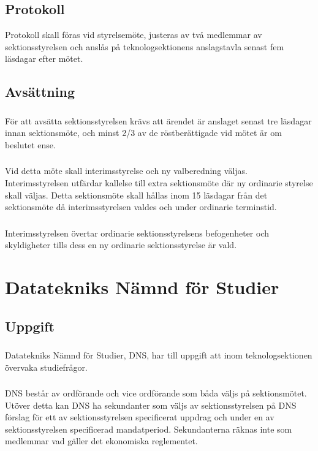 \documentclass[a4paper]{dtek}
\begin{document}
\subsection{Protokoll}
Protokoll skall föras vid styrelsemöte, justeras av två medlemmar av sektionsstyrelsen och anslås på teknologsektionens anslagstavla senast fem läsdagar efter mötet.
\subsection{Avsättning}
\subsubsection{}
För att avsätta sektionsstyrelsen krävs att ärendet är anslaget senast tre läsdagar innan sektionsmöte, och minst 2/3 av de röstberättigade vid mötet är om beslutet ense.
\subsubsection{}
Vid detta möte skall interimsstyrelse och ny valberedning väljas. Interimsstyrelsen utfärdar kallelse till extra sektionsmöte där ny ordinarie styrelse skall väljas. Detta sektionsmöte skall hållas inom 15 läsdagar från det sektionsmöte då interimsstyrelsen valdes och under ordinarie terminstid.
\subsubsection{}
Interimsstyrelsen övertar ordinarie sektionsstyrelsens befogenheter och skyldigheter tills dess en ny ordinarie sektionsstyrelse är vald.
\newpage

\section{Datatekniks Nämnd för Studier}
\subsection{Uppgift}
\subsubsection{}
Datatekniks Nämnd för Studier, DNS, har till uppgift att inom teknologsektionen övervaka studiefrågor.
\subsubsection{}
DNS består av ordförande och vice ordförande som båda väljs på sektionsmötet. Utöver detta kan DNS ha sekundanter som väljs av sektionsstyrelsen på DNS förslag för ett av sektionsstyrelsen specificerat uppdrag och under en av sektionsstyrelsen specificerad mandatperiod. Sekundanterna räknas inte som medlemmar vad gäller det ekonomiska reglementet.
\end{document}
